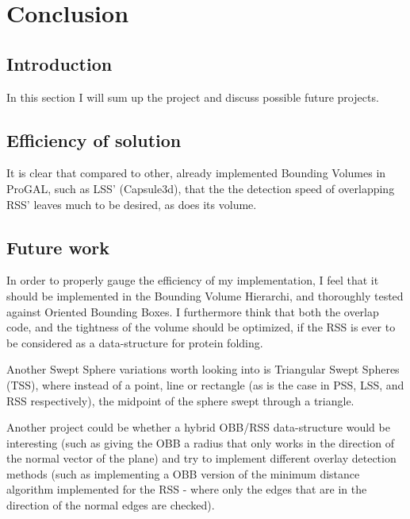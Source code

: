 
\section{Conclusion}
\label{conclusion}
\subsection{Introduction}
In this section I will sum up the project and discuss possible future projects. 

\subsection{Efficiency of solution}
It is clear that compared to other, already implemented Bounding Volumes in ProGAL, such as LSS' (Capsule3d), that the the detection speed of overlapping RSS' leaves much to be desired, as does its volume.

\subsection{Future work}
In order to properly gauge the efficiency of my implementation, I feel that it should be implemented in the Bounding Volume Hierarchi, and thoroughly tested against Oriented Bounding Boxes. I furthermore think that both the overlap code, and the tightness of the volume should be optimized, if the RSS is ever to be considered as a data-structure for protein folding. 

Another Swept Sphere variations worth looking into is Triangular Swept Spheres (TSS), where instead of a point, line or rectangle (as is the case in PSS, LSS, and RSS respectively), the midpoint of the sphere swept through a triangle. 

Another project could be whether a hybrid OBB/RSS data-structure would be interesting (such as giving the OBB a radius that only works in the direction of the normal vector of the plane) and try to implement different overlay detection methods (such as implementing a OBB version of the minimum distance algorithm implemented for the RSS - where only the edges that are in the direction of the normal edges are checked).
